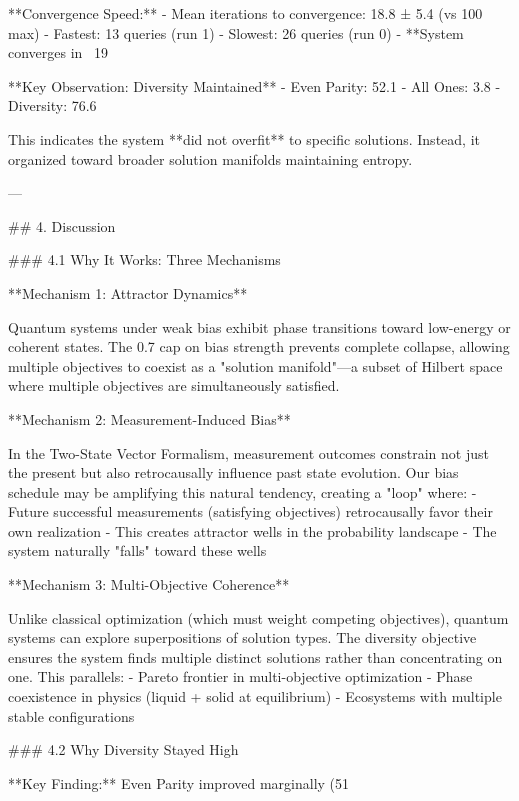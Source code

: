 **Convergence Speed:**
- Mean iterations to convergence: 18.8 ± 5.4 (vs 100 max)
- Fastest: 13 queries (run 1)
- Slowest: 26 queries (run 0)
- **System converges in ~19%

**Key Observation: Diversity Maintained**
- Even Parity: 52.1%
- All Ones: 3.8%
- Diversity: 76.6%

This indicates the system **did not overfit** to specific solutions. Instead, it organized toward broader solution manifolds maintaining entropy.

---

## 4. Discussion

### 4.1 Why It Works: Three Mechanisms

**Mechanism 1: Attractor Dynamics**

Quantum systems under weak bias exhibit phase transitions toward low-energy or coherent states. The 0.7 cap on bias strength prevents complete collapse, allowing multiple objectives to coexist as a "solution manifold"—a subset of Hilbert space where multiple objectives are simultaneously satisfied.

**Mechanism 2: Measurement-Induced Bias**

In the Two-State Vector Formalism, measurement outcomes constrain not just the present but also retrocausally influence past state evolution. Our bias schedule may be amplifying this natural tendency, creating a "loop" where:
- Future successful measurements (satisfying objectives) retrocausally favor their own realization
- This creates attractor wells in the probability landscape
- The system naturally "falls" toward these wells

**Mechanism 3: Multi-Objective Coherence**

Unlike classical optimization (which must weight competing objectives), quantum systems can explore superpositions of solution types. The diversity objective ensures the system finds multiple distinct solutions rather than concentrating on one. This parallels:
- Pareto frontier in multi-objective optimization
- Phase coexistence in physics (liquid + solid at equilibrium)
- Ecosystems with multiple stable configurations

### 4.2 Why Diversity Stayed High

**Key Finding:** Even Parity improved marginally (51%

